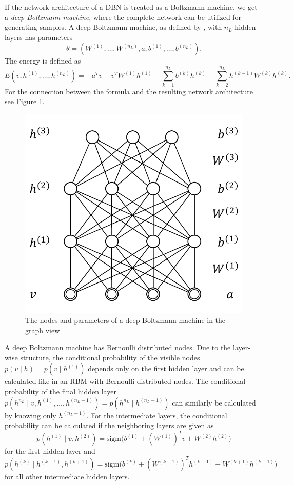 \documentclass[12pt]{article}
\newcommand{\sigm}{\mathrm{sigm}}
\begin{document}
If the network architecture of a DBN is treated as a Boltzmann machine, we get a \emph{deep Boltzmann machine}, where the complete network can be utilized for generating samples.
A deep Boltzmann machine, as defined by \cite{salakhutdinov2009DBMs}, with $n_L$ hidden layers has parameters
\[
\theta = \left (W^{(1)}, \dots, W^{(n_L)}, a, b^{(1)}, \dots, b^{(n_L)} \right).
\]
The energy is defined as
\[
E(v, h^{(1)}, \dots, h^{(n_L)}) = - a^T v - v^T W^{(1)} h^{(1)} - \sum_{k=1}^{n_L} b^{(k)} h^{(k)} -  \sum_{k=2}^{n_L} h^{(k-1)}W^{(k)}h^{(k)}.
\]
For the connection between the formula and the resulting network architecture see Figure \ref{fig:dbmweights}.
\begin{figure}[h]
   \centering
   \includegraphics[scale=0.6]{images/dbmweights.pdf}
   \caption{The nodes and parameters of a deep Boltzmann machine in the graph view}
   \label{fig:dbmweights}
 \end{figure}

A deep Boltzmann machine has Bernoulli distributed nodes.
Due to the layer-wise structure, the conditional probability of the visible nodes $p(v \mid h) = p(v \mid h^{(1)})$ depends only on the first hidden layer and can be calculated like in an RBM with Bernoulli distributed nodes.
The conditional probability of the final hidden layer $p \left( h^{n_L} \mid v, h^{(1)}, \dots, h^{(n_L -1)} \right) = p \left( h^{n_L} \mid h^{(n_L -1)} \right)$ can similarly be calculated by knowing only $h^{(n_L-1)}$.
For the intermediate layers, the conditional probability can be calculated if the neighboring layers are given as
\begin{equation}
p\left(h^{(1)} \mid v, h^{(2)}\right) = \sigm \bigg( b^{(1)} + (W^{(1)})^T v + W^{(2)} h^{(2)} \bigg)
\label{dbmcondprobfirsthidden}
\end{equation}
for the first hidden layer and
\begin{equation}
p\left(h^{(k)} \mid h^{(k-1)}, h^{(k+1)} \right) = \sigm \bigg( b^{(k)} + (W^{(k-1)})^T h^{(k-1)} + W^{(k+1)} h^{(k+1)} \bigg)
\label{dbmcondprobintermediate}
\end{equation}
for all other intermediate hidden layers.
\end{document}
